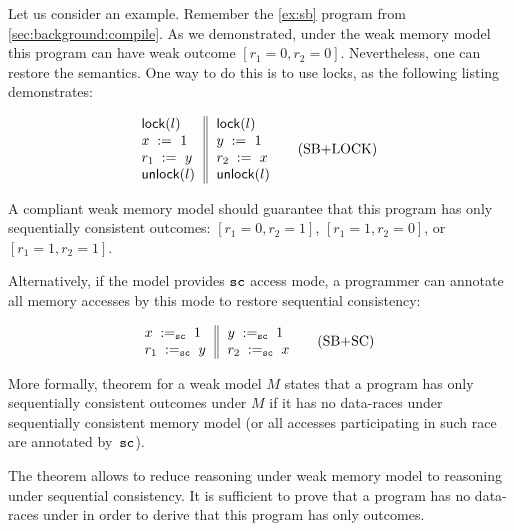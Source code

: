 Let us consider an example. 
Remember the \ref{ex:sb} program from \cref{sec:background:compile}.
As we demonstrated, under the weak memory model 
this program can have weak outcome ${[r_1=0, r_2=0]}$.
Nevertheless, one can restore the \SC semantics.
One way to do this is to use locks, as the following listing demonstrates:

\begin{equation*}
\inarrII{
   \lockInst{l}         \\
   \writeInst{}{x}{1}   \\
   \readInst{}{r_1}{y}  \\
   \unlockInst{l}       \\
}{
   \lockInst{l}         \\
   \writeInst{}{y}{1}   \\
   \readInst{}{r_2}{x}  \\
   \unlockInst{l}       \\
}
\tag{SB+LOCK}\label{ex:sb-lock}
\end{equation*}

A \DRF compliant weak memory model should guarantee 
that this program has only sequentially consistent outcomes:
${[r_1=0, r_2=1]}$, ${[r_1=1,r_2=0]}$, or ${[r_1=1,r_2=1]}$.

Alternatively, if the model provides ${\mathtt{sc}}$ access mode, 
a programmer can annotate all memory accesses by this mode
to restore sequential consistency:  
 
\begin{equation*}
\inarrII{
   \writeInst{\sco}{x}{1}   \\
   \readInst{\sco}{r_1}{y}  \\
}{
   \writeInst{\sco}{y}{1}   \\
   \readInst{\sco}{r_2}{x}  \\
}
\tag{SB+SC}\label{ex:sb-sc}
\end{equation*}

More formally, \DRF theorem for a weak model $M$ states that 
a program has only sequentially consistent outcomes under $M$
if it has no data-races under sequentially consistent memory model
(or all accesses participating in such race are annotated by~${\mathtt{sc}}$).

The \DRF theorem allows to reduce reasoning under weak memory model
to reasoning under sequential consistency.
It is sufficient to prove that a program has no data-races under \SC
in order to derive that this program has only \SC outcomes. 

